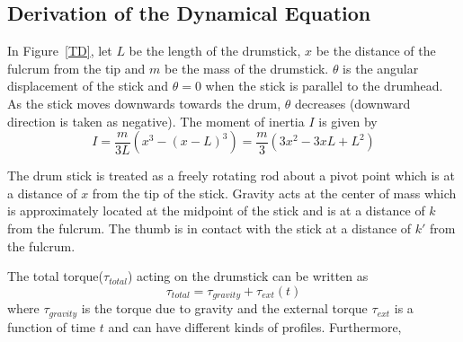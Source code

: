 \documentclass[final,1p,times]{elsarticle}
\begin{document}
\subsection{Derivation of the Dynamical Equation}
In Figure~\ref{TD}, let $L$ be the length of the drumstick, $x$ be the distance of the fulcrum from the tip and $m$ be the mass of the drumstick. $\theta$ is the angular displacement of the stick and $\theta = 0$ when the stick is parallel to the drumhead. As the stick moves downwards towards the drum, $\theta$ decreases (downward direction is taken as negative). The moment of inertia $I$ is given by
\begin{equation} \label{eq1}
I = \frac{m}{3L}(x^3 - (x-L)^3) = \frac{m}{3}(3x^2 - 3xL + L^2)
\end{equation}

The drum stick is treated as a freely rotating rod about a pivot point
which is at a distance of $x$ from the tip of the stick. Gravity acts at the center of mass which is approximately located at the midpoint of the stick and is at a distance of $k$ from the fulcrum. The thumb is in contact with the stick at a distance of $k'$ from the fulcrum.

The total torque($\tau_{total}$) acting on the drumstick can be written as
\begin{equation*} 
\tau_{total} = \tau_{gravity} + \tau_{ext}(t)
\end{equation*}
where $\tau_{gravity}$ is the torque due to gravity and the external torque $\tau_{ext}$ is a function of time $t$ and can have different kinds of profiles. 
Furthermore, 
\end{document}
